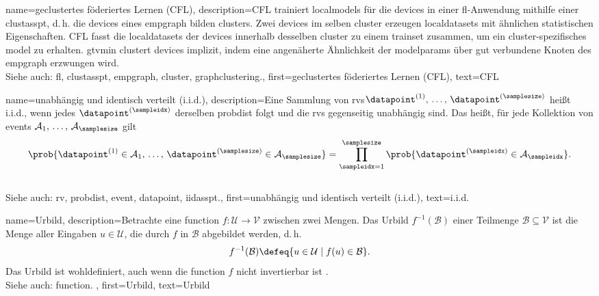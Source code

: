 {{{{
{name={geclustertes föderiertes Lernen (CFL)}, 
	description={CFL trainiert \glspl{localmodel} 
		für die \glspl{device} in einer \gls{fl}-Anwendung mithilfe einer \gls{clustasspt}, 
		d.\,h. die \glspl{device} eines \gls{empgraph} bilden \glspl{cluster}. 
		Zwei \glspl{device} im selben \gls{cluster} erzeugen \glspl{localdataset} 
		mit ähnlichen statistischen Eigenschaften. CFL fasst die \glspl{localdataset} 
		der \glspl{device} innerhalb desselben \gls{cluster} zu einem \gls{trainset} 
		zusammen, um ein \gls{cluster}-spezifisches \gls{model} zu erhalten. 
		\Gls{gtvmin} clustert \glspl{device} implizit, indem eine angenäherte Ähnlichkeit 
		der \glspl{modelparam} über gut verbundene Knoten des \gls{empgraph} erzwungen wird.
		\\ 
		Siehe auch: \gls{fl}, \gls{clustasspt}, \gls{empgraph}, \gls{cluster}, \gls{graphclustering}.},
	first={geclustertes föderiertes Lernen (CFL)},
	text={CFL} 
}

{name={unabhängig und identisch verteilt (i.i.d.)}, 
	description={Eine Sammlung von \glspl{rv}\linebreak $\datapoint^{(1)}, \,\ldots, \,\datapoint^{(\samplesize)}$ 
		heißt i.i.d., 
		wenn jedes $\datapoint^{(\sampleidx)}$ derselben \gls{probdist} folgt und 
		die \glspl{rv} gegenseitig unabhängig sind. Das heißt, für jede Kollektion von 
		\glspl{event} $\mathcal{A}_1, \,\ldots, \,\mathcal{A}_\samplesize$ gilt
       		\[
          		\prob{ \datapoint^{(1)} \in \mathcal{A}_1, \,\ldots, \,\datapoint^{(\samplesize)} \in \mathcal{A}_{\samplesize}} 
         		= \prod_{\sampleidx=1}^{\samplesize} \prob{ \datapoint^{(\sampleidx)} \in \mathcal{A}_\sampleidx}.
         	\]
				\\
		Siehe auch: \gls{rv}, \gls{probdist}, \gls{event}, \gls{datapoint}, \gls{iidasspt}.},
	first={unabhängig und identisch verteilt (i.i.d.)},
	text={{i.i.d.}} 
}

{name={Urbild}, 
	description={Betrachte eine \gls{function} $f\colon \mathcal{U} \rightarrow \mathcal{V}$ 
		zwischen zwei Mengen. Das Urbild $f^{-1}(\mathcal{B})$ einer Teilmenge $\mathcal{B} \subseteq \mathcal{V}$ 
		ist die Menge aller Eingaben $u \in \mathcal{U}$, die durch $f$ in $\mathcal{B}$ abgebildet werden, d.\,h.
		\[
		f^{-1}(\mathcal{B}) \defeq \{ u \in \mathcal{U} \mid f(u) \in \mathcal{B} \}.
		\]
		Das Urbild ist wohldefiniert, auch wenn die \gls{function} $f$ nicht invertierbar ist \cite{RudinBookPrinciplesMatheAnalysis}.
		\\
		Siehe auch: \gls{function}. },
	first={Urbild},
	text={Urbild}
}

}}}}
